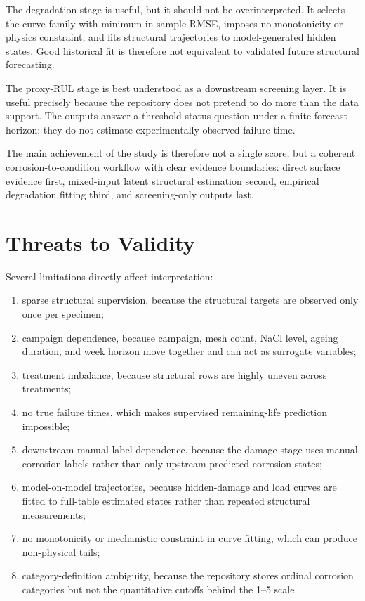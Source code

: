 \documentclass[conference]{IEEEtran}
\begin{document}
The degradation stage is useful, but it should not be overinterpreted. It selects the curve family with minimum in-sample RMSE, imposes no monotonicity or physics constraint, and fits structural trajectories to model-generated hidden states. Good historical fit is therefore not equivalent to validated future structural forecasting.

The proxy-RUL stage is best understood as a downstream screening layer. It is useful precisely because the repository does not pretend to do more than the data support. The outputs answer a threshold-status question under a finite forecast horizon; they do not estimate experimentally observed failure time.

The main achievement of the study is therefore not a single score, but a coherent corrosion-to-condition workflow with clear evidence boundaries: direct surface evidence first, mixed-input latent structural estimation second, empirical degradation fitting third, and screening-only outputs last.

\section{Threats to Validity}
Several limitations directly affect interpretation:
\begin{enumerate}
    \item sparse structural supervision, because the structural targets are observed only once per specimen;
    \item campaign dependence, because campaign, mesh count, NaCl level, ageing duration, and week horizon move together and can act as surrogate variables;
    \item treatment imbalance, because structural rows are highly uneven across treatments;
    \item no true failure times, which makes supervised remaining-life prediction impossible;
    \item downstream manual-label dependence, because the damage stage uses manual corrosion labels rather than only upstream predicted corrosion states;
    \item model-on-model trajectories, because hidden-damage and load curves are fitted to full-table estimated states rather than repeated structural measurements;
    \item no monotonicity or mechanistic constraint in curve fitting, which can produce non-physical tails;
    \item category-definition ambiguity, because the repository stores ordinal corrosion categories but not the quantitative cutoffs behind the 1--5 scale.
\end{enumerate}
\end{document}
